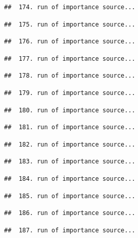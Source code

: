 \documentclass[
]{article}
\begin{document}
\begin{verbatim}
##  174. run of importance source...
\end{verbatim}

\begin{verbatim}
##  175. run of importance source...
\end{verbatim}

\begin{verbatim}
##  176. run of importance source...
\end{verbatim}

\begin{verbatim}
##  177. run of importance source...
\end{verbatim}

\begin{verbatim}
##  178. run of importance source...
\end{verbatim}

\begin{verbatim}
##  179. run of importance source...
\end{verbatim}

\begin{verbatim}
##  180. run of importance source...
\end{verbatim}

\begin{verbatim}
##  181. run of importance source...
\end{verbatim}

\begin{verbatim}
##  182. run of importance source...
\end{verbatim}

\begin{verbatim}
##  183. run of importance source...
\end{verbatim}

\begin{verbatim}
##  184. run of importance source...
\end{verbatim}

\begin{verbatim}
##  185. run of importance source...
\end{verbatim}

\begin{verbatim}
##  186. run of importance source...
\end{verbatim}

\begin{verbatim}
##  187. run of importance source...
\end{verbatim}
\end{document}
